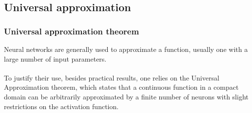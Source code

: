 \documentclass[bigger]{beamer}
\begin{document}
\subsection{Universal approximation}
\begin{frame}
\frametitle{Universal approximation theorem} 
  \justifying
Neural networks are generally used to approximate a function, usually one with a large number of input parameters. 
\\~\\
To justify their use, besides practical results, one relies on the Universal Approximation theorem, which states that a continuous function in a compact domain can be arbitrarily approximated by a finite number of neurons with slight restrictions on the activation function. 
\end{frame}
\end{document}
